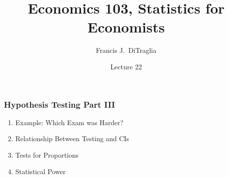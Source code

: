 \documentclass[handout]{beamer}
\title[Econ 103]{Economics 103, Statistics for Economists}
\author[F. DiTraglia]{Francis J.\ DiTraglia}
\institute{University of Pennsylvania}
\date{Lecture 22}
\begin{document}
 





\begin{frame}[plain]
	\titlepage 
	

\end{frame} 




\begin{frame}
\frametitle{Hypothesis Testing Part III}
	\begin{enumerate}
\item Example: Which Exam was Harder?
\item Relationship Between Testing and CIs
\item Tests for Proportions 
\item \alert{Statistical Power}
\end{enumerate}
\end{frame}
\end{document}
